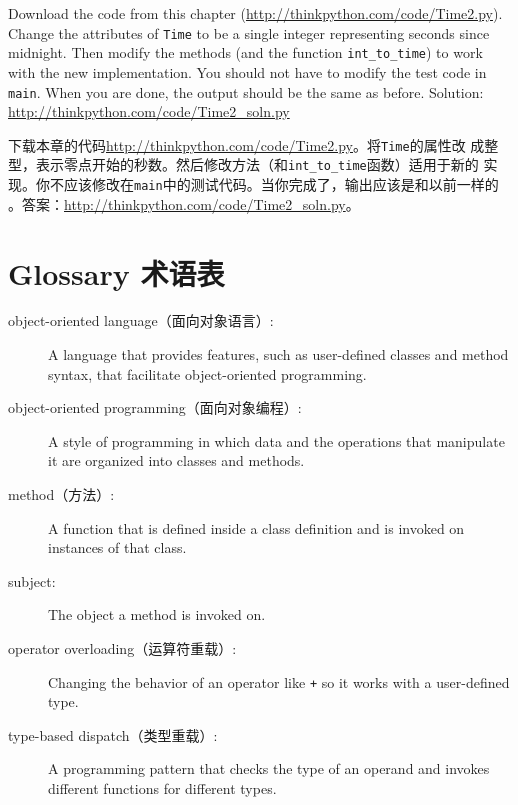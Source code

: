 \documentclass[10pt]{book}
\begin{document}
\begin{CJK}{UTF8}{gbsn}
\begin{exercise}
Download the code from this chapter
(\url{http://thinkpython.com/code/Time2.py}).  Change the attributes
of {\tt Time} to be a single integer representing seconds since
midnight.  Then modify the methods (and the function
\verb"int_to_time") to work with the new implementation.  You should
not have to modify the test code in {\tt main}.  When you are done,
the output should be the same as before.  Solution:
\url{http://thinkpython.com/code/Time2_soln.py}

下载本章的代码\url{http://thinkpython.com/code/Time2.py}。将{\tt Time}的属性改
成整型，表示零点开始的秒数。然后修改方法（和\verb"int_to_time"函数）适用于新的
实现。你不应该修改在{\tt main}中的测试代码。当你完成了，输出应该是和以前一样的
。答案：\url{http://thinkpython.com/code/Time2_soln.py}。


\end{exercise}


\section{Glossary 术语表}

\begin{description}

\item[object-oriented language（面向对象语言）:] A language that provides features,
  such as user-defined classes and method syntax, that facilitate
  object-oriented programming.

\item[object-oriented programming（面向对象编程）:] A style of programming in which
data and the operations that manipulate it are organized into classes
and methods.

\item[method（方法）:] A function that is defined inside a class definition and
is invoked on instances of that class.

\item[subject:] The object a method is invoked on.

\item[operator overloading（运算符重载）:] Changing the behavior of an operator like
{\tt +} so it works with a user-defined type.

\item[type-based dispatch（类型重载）:] A programming pattern that checks the type
of an operand and invokes different functions for different types.


\end{description}
\end{CJK}
\end{document}
